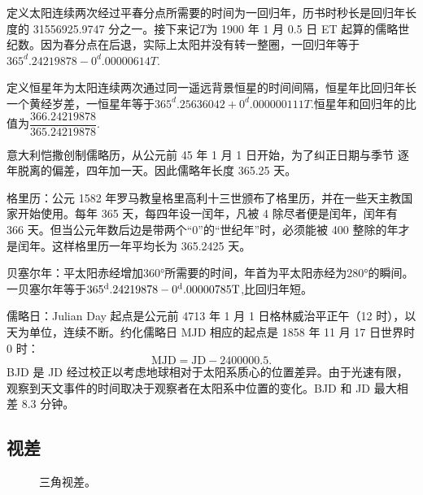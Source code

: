 \documentclass[11pt, a4paper, oneside]{ctexart}
\numberwithin{equation}{subsection}
\begin{document}
定义太阳连续两次经过平春分点所需要的时间为一回归年，历书时秒长是回归年长度的 31556925.9747 分之一。接下来记$T$为 1900 年 1 月 0.5 日 ET 起算的儒略世纪数。因为春分点在后退，实际上太阳并没有转一整圈，一回归年等于$365^{\unit{d}}.24219878-0^{\unit{d}}.00000614T$.

定义恒星年为太阳连续两次通过同一遥远背景恒星的时间间隔，恒星年比回归年长一个黄经岁差，一恒星年等于$365^{\unit{d}}.25636042+0^{\unit{d}}.000000111T$.恒星年和回归年的比值为$\dfrac{366.24219878}{365.24219878}$.

意大利恺撒创制儒略历，从公元前 45 年 1 月 1 日开始，为了纠正日期与季节
逐年脱离的偏差，四年加一天。因此儒略年长度 365.25 天。

格里历：公元 1582 年罗马教皇格里高利十三世颁布了格里历，并在一些天主教国家开始使用。每年 365 天，每四年设一闰年，凡被 4 除尽者便是闰年，闰年有 366 天。但当公元年数后边是带两个“0”的“世纪年”时，必须能被 400 整除的年才是闰年。这样格里历一年平均长为 365.2425 天。

贝塞尔年：平太阳赤经增加$\ang{360;;}$所需要的时间，年首为平太阳赤经为$\ang{280;;}$的瞬间。一贝塞尔年等于$\rm 365^{\unit{d}}.24219878-0^{\unit{d}}.00000785T$,比回归年短。

儒略日：Julian Day 起点是公元前 4713 年 1 月 1 日格林威治平正午（12 时），以天为单位，连续不断。约化儒略日 MJD 相应的起点是 1858 年 11 月 17 日世界时 0 时：
\begin{equation}
\text{MJD}=\text{JD}-2400000.5.
\end{equation}
BJD 是 JD 经过校正以考虑地球相对于太阳系质心的位置差异。由于光速有限，观察到天文事件的时间取决于观察者在太阳系中位置的变化。BJD 和 JD 最大相差 8.3 分钟。

\subsection{视差}
\begin{figure}[!htp]
\centering
{}
\captionsetup{justification=raggedright, singlelinecheck=false}
\caption{三角视差。}
\label{三角视差。}
\end{figure}
\end{document}

